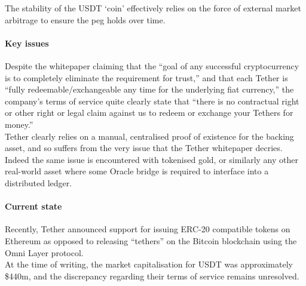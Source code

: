 \noindent The stability of the USDT `coin' effectively relies on the force of external market arbitrage to ensure the peg holds over time.

\paragraph{Key issues}

Despite the whitepaper claiming that the ``goal of any successful cryptocurrency is to completely eliminate the requirement for trust,'' and that each Tether is ``fully redeemable/exchangeable any time for the underlying fiat currency,'' the company's terms of service quite clearly state that ``there is no contractual right or other right or legal claim against us to redeem or exchange your Tethers for money.'' \\

\noindent Tether clearly relies on a manual, centralised proof of existence for the backing asset, and so suffers from the very issue that the Tether whitepaper decries. Indeed the same issue is encountered with tokenised gold, or similarly any other real-world asset where some Oracle bridge is required to interface into a distributed ledger.

\paragraph{Current state}

Recently, Tether announced support for issuing ERC-20 compatible tokens on Ethereum as opposed to releasing ``tethers'' on the Bitcoin blockchain using the Omni Layer protocol. \\

\noindent At the time of writing, the market capitalisation for USDT was approximately \$440m, and the discrepancy regarding their terms of service remains unresolved. \\





